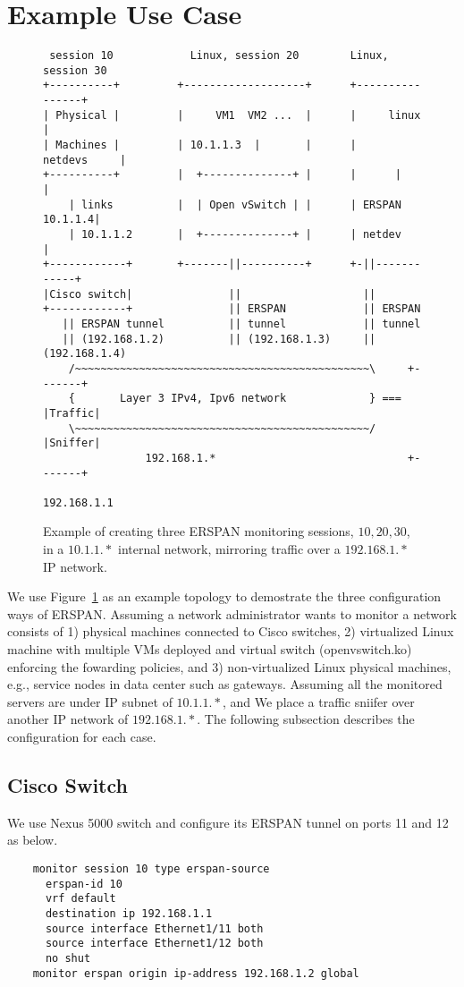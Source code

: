 \documentclass{sigplanconf}
\begin{document}
\section{Example Use Case}
\begin{figure}
{\scriptsize
\begin{verbatim}
 session 10            Linux, session 20        Linux, session 30
+----------+         +-------------------+      +----------------+
| Physical |         |     VM1  VM2 ...  |      |     linux      |
| Machines |         | 10.1.1.3  |       |      |    netdevs     |
+----------+         |  +--------------+ |      |      |         |
    | links          |  | Open vSwitch | |      | ERSPAN 10.1.1.4|
    | 10.1.1.2       |  +--------------+ |      | netdev         |
+------------+       +-------||----------+      +-||------------+ 
|Cisco switch|               ||                   ||
+------------+               || ERSPAN            || ERSPAN
   || ERSPAN tunnel          || tunnel            || tunnel
   || (192.168.1.2)          || (192.168.1.3)     || (192.168.1.4)
    /~~~~~~~~~~~~~~~~~~~~~~~~~~~~~~~~~~~~~~~~~~~~~~\     +-------+ 
    {       Layer 3 IPv4, Ipv6 network             } === |Traffic|
    \~~~~~~~~~~~~~~~~~~~~~~~~~~~~~~~~~~~~~~~~~~~~~~/     |Sniffer|
                192.168.1.*                              +-------+
                                                        192.168.1.1
\end{verbatim}   
}
\vspace{-0.5em}
\caption{Example of creating three ERSPAN monitoring sessions, $10, 20, 30$,
in a $10.1.1.*$ internal network, mirroring traffic over a $192.168.1.*$ IP network.}
\label{example}
\vspace{-1.0em}
\end{figure}

We use Figure~\ref{example} as an example topology to demostrate
the three configuration ways of ERSPAN.
Assuming a network administrator wants to monitor a network consists
of 1) physical machines connected to Cisco switches, 2)
virtualized Linux machine with multiple VMs deployed and virtual switch
(openvswitch.ko) enforcing the fowarding policies, and
3) non-virtualized Linux physical machines, e.g., service nodes
in data center such as gateways.
Assuming all the monitored servers are under IP subnet of $10.1.1.*$,
and We place a traffic sniifer over another IP network of $192.168.1.*$.
The following subsection describes the configuration for each case.

\subsection{Cisco Switch}
We use Nexus 5000 switch and configure its ERSPAN tunnel
on ports 11 and 12 as below.
\begin{verbatim}
    monitor session 10 type erspan-source
      erspan-id 10
      vrf default
      destination ip 192.168.1.1
      source interface Ethernet1/11 both
      source interface Ethernet1/12 both
      no shut
    monitor erspan origin ip-address 192.168.1.2 global
\end{verbatim}
\end{document}
